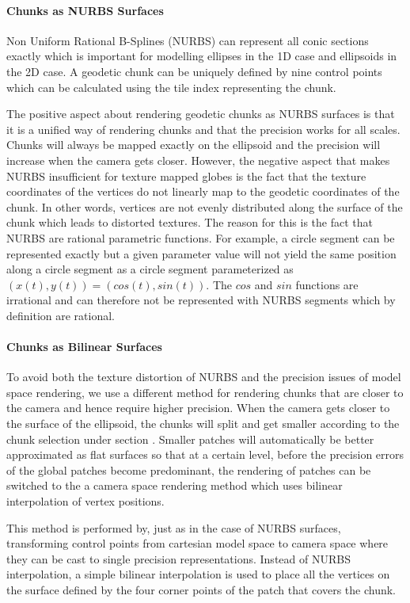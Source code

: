\paragraph{Chunks as NURBS Surfaces}
Non Uniform Rational B-Splines (NURBS) can represent all conic sections exactly which is important for modelling ellipses in the 1D case and ellipsoids in the 2D case. A geodetic chunk can be uniquely defined by nine control points which can be calculated using the tile index representing the chunk.

The positive aspect about rendering geodetic chunks as NURBS surfaces is that it is a unified way of rendering chunks and that the precision works for all scales. Chunks will always be mapped exactly on the ellipsoid and the precision will increase when the camera gets closer. However, the negative aspect that makes NURBS insufficient for texture mapped globes is the fact that the texture coordinates of the vertices do not linearly map to the geodetic coordinates of the chunk. In other words, vertices are not evenly distributed along the surface of the chunk which leads to distorted textures. The reason for this is the fact that NURBS are rational parametric functions. For example, a circle segment can be represented exactly but a given parameter value will not yield the same position along a circle segment as a circle segment parameterized as $(x(t),y(t)) = (cos(t), sin(t))$. The $cos$ and $sin$ functions are irrational and can therefore not be represented with NURBS segments which by definition are rational.

\paragraph{Chunks as Bilinear Surfaces}
To avoid both the texture distortion of NURBS and the precision issues of model space rendering, we use a different method for rendering chunks that are closer to the camera and hence require higher precision. When the camera gets closer to the surface of the ellipsoid, the chunks will split and get smaller according to the chunk selection under section . Smaller patches will automatically be better approximated as flat surfaces so that at a certain level, before the precision errors of the global patches become predominant, the rendering of patches can be switched to the a camera space rendering method which uses bilinear interpolation of vertex positions.

This method is performed by, just as in the case of NURBS surfaces, transforming control points from cartesian model space to camera space where they can be cast to single precision representations. Instead of NURBS interpolation, a simple bilinear interpolation is used to place all the vertices on the surface defined by the four corner points of the patch that covers the chunk.

